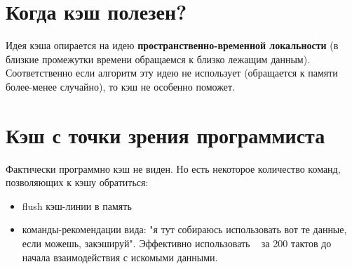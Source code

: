 \documentclass[12pt, a4paper]{article}
\begin{document}
\section{Когда кэш полезен?}
Идея кэша опирается на идею \textbf{пространственно-временной локальности} (в близкие промежутки времени обращаемся к близко лежащим данным). Соответственно если алгоритм эту идею не использует (обращается к памяти более-менее случайно), то кэш не особенно поможет.
\section{Кэш с точки зрения программиста}
Фактически программно кэш не виден. Но есть некоторое количество команд, позволяющих к кэшу обратиться:
\begin{itemize}
    \item flush кэш-линии в память
    \item команды-рекомендации вида: "я тут собираюсь использовать вот те данные, если можешь, закэшируй". Эффективно использовать ~ за 200 тактов до начала взаимодействия с искомыми данными.
\end{itemize}
\end{document}
